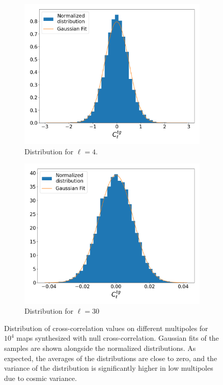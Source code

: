 \documentclass[openany,a4paper,12pt,oneside]{book}
\begin{document}
\begin{spacing}{1.5}
\begin{figure}[!htb]
	\centering
	\begin{subfigure}[b]{0.49\textwidth}
		\includegraphics[width=\linewidth]{Imagens/hist_l4.png}
		\caption{Distribution for $\ell=4$.}
		\label{subfig:Hist_l4}
	\end{subfigure}
	\hfill
	\begin{subfigure}[b]{0.49\textwidth}
		\includegraphics[width=\linewidth]{Imagens/hist_l30.png}
		\caption{Distribution for $\ell=30$}
		\label{subfig:Hist_l30}
	\end{subfigure}
	\caption{Distribution of cross-correlation values on different multipoles for $10^4$ maps synthesized with null cross-correlation. Gaussian fits of the samples are shown alongside the normalized distributions. As expected, the averages of the distributions are close to zero, and the variance of the distribution is significantly higher in low multipoles due to cosmic variance.}
	\label{fig:synthmaps_histograms}
\end{figure}


\end{spacing}
\end{document}
